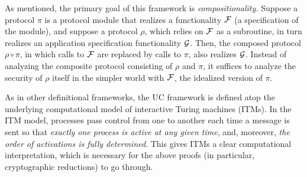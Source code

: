 As mentioned, the primary goal of this framework is
\emph{compositionality.}
Suppose a protocol $\pi$ is a protocol module that realizes a functionality $\mathcal{{F}}$ (a specification of the module),
and suppose a protocol $\rho$, which relies on $\mathcal{{F}}$ as a subroutine, in turn realizes an application specification functionality $\mathcal{{G}}$.
Then, the composed protocol $\rho \circ \pi$, in which calls to
$\mathcal{{F}}$ are replaced by calls to $\pi$, also realizes $\mathcal{{G}}$.
%
Instead of analyzing the composite protocol consisting of $\rho$ and $\pi$,
it suffices to analyze the security of $\rho$ itself in the simpler
world with $\mathcal{{F}}$, the idealized version of $\pi$.

As in other definitional frameworks, the UC framework is defined atop the
underlying computational model of interactive Turing machines (ITMs). In the ITM
model, processes pass control from one to another each time a message is sent so
that \emph{exactly one process is active at any given time}, and, moreover,
\emph{the order of activations is fully determined}. This gives ITMs a clear
computational interpretation, which is necessary for the above proofs (in
particular, cryptographic reductions) to go through. 

